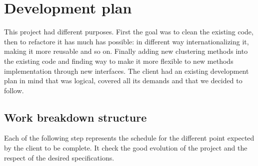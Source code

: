 \section{Development plan}
This project had different purposes. First the goal was to clean the existing code, then to refactore it has much has possible: in different way internationalizing it, making it more reusable and so on. Finally adding new clustering methods into the existing code and finding way to make it more flexible to new methods implementation through new interfaces.
The client had an existing development plan in mind that was logical, covered all its demands and that we decided to follow.


\subsection{Work breakdown structure}
Each of the following step represents the schedule for the different point expected by the client to be complete. It check the good evolution of the project and the respect of the desired specifications.
